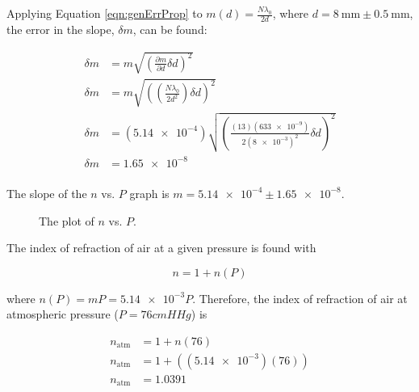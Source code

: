 \documentclass[12pt]{article}
\begin{document}
Applying Equation \ref{eqn:genErrProp} to \(m(d) = \frac{N \lambda_0}{2 d}\),
where \(d = \SI{8}{\milli\meter} \pm \SI{0.5}{\milli\meter}\), the error in the
slope, \(\delta m\), can be found:

\begin{align*}
  \delta m &= m \sqrt{\left( \frac{\partial m}{\partial d} \delta d \right) ^ 2}
  \\
  \delta m &= m \sqrt{ \left( \left( \frac{N \lambda_0}{2 d^2}
             \right) \delta d \right) ^ 2} \\
  \delta m &= (\num{5.14e-4}) \sqrt{ \left( \frac{(13)(\num{633e-9})}{2
             (\num{8e-3})^2} \delta d  \right) ^ 2} \\
  \delta m &= \num{1.65e-8} \\
\end{align*}

\qq The slope of the \(n\) vs. \(P\) graph is \(m = \num{5.14e-4} \pm
\num{1.65e-8}\). 

\begin{figure}[H]
  \label{gph:nVP}
  \begin{center}
  \end{center}
  \caption{The plot of \(n\) vs. \(P\).}
\end{figure}

\qq The index of refraction of air at a given pressure is found with

\begin{equation}
  \label{eqn:indexOfRefAir}
  n = 1 + n(P)
\end{equation}

where \(n(P) = m P = \num{5.14e-3} P\). Therefore, the index of refraction of
air at atmospheric pressure (\(P = 76 cmH Hg\)) is

\begin{align*}
  n_{\text{atm}} &= 1 + n(76) \\
  n_{\text{atm}} &= 1 + ((\num{5.14e-3})(76)) \\
  n_{\text{atm}} &= \num{1.0391} \\
\end{align*}
\end{document}
